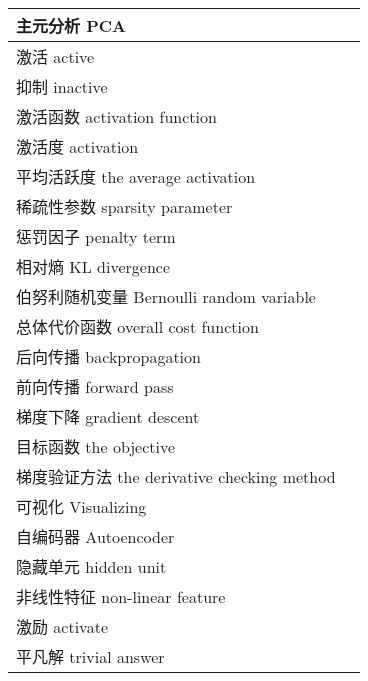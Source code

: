\begin{longtable}[h]{m{}m{}}
主元分析 PCA \\
  \midrule

激活 active \\
  \midrule

抑制 inactive \\
  \midrule

激活函数 activation function \\
  \midrule

激活度 activation \\
  \midrule

平均活跃度 the average activation \\
  \midrule

稀疏性参数 sparsity parameter \\
  \midrule

惩罚因子 penalty term \\
  \midrule

相对熵 KL divergence \\
  \midrule

伯努利随机变量 Bernoulli random variable \\
  \midrule

总体代价函数 overall cost function \\
  \midrule

后向传播 backpropagation \\
  \midrule

前向传播 forward pass \\
  \midrule

梯度下降 gradient descent \\
  \midrule

目标函数 the objective \\
  \midrule

梯度验证方法 the derivative checking method \\
  \midrule

可视化 Visualizing \\
  \midrule

自编码器 Autoencoder \\
  \midrule

隐藏单元 hidden unit \\
  \midrule

非线性特征 non-linear feature \\
  \midrule

激励 activate \\
  \midrule

平凡解 trivial answer \\
  \midrule


\end{longtable}
